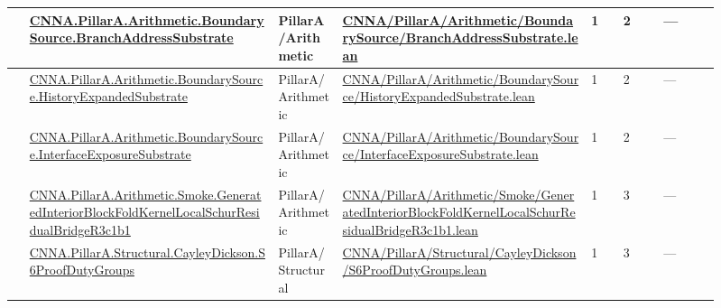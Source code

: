 \begin{longtable}{L{0.025\linewidth} L{0.315\linewidth} L{0.08\linewidth} L{0.315\linewidth} L{0.045\linewidth} L{0.055\linewidth} L{0.07\linewidth}}
\hline
{} & \href{run:repo_snapshot/CNNA/PillarA/Arithmetic/BoundarySource/BranchAddressSubstrate.lean}{CNNA.\allowbreak{}PillarA.\allowbreak{}Arithmetic.\allowbreak{}BoundarySource.\allowbreak{}BranchAddressSubstrate} & PillarA/\allowbreak{}Arithmetic & \href{run:repo_snapshot/CNNA/PillarA/Arithmetic/BoundarySource/BranchAddressSubstrate.lean}{CNNA/\allowbreak{}PillarA/\allowbreak{}Arithmetic/\allowbreak{}BoundarySource/\allowbreak{}BranchAddressSubstrate.\allowbreak{}lean} & 1 & 2 & ---\\
\hline
{} & \href{run:repo_snapshot/CNNA/PillarA/Arithmetic/BoundarySource/HistoryExpandedSubstrate.lean}{CNNA.\allowbreak{}PillarA.\allowbreak{}Arithmetic.\allowbreak{}BoundarySource.\allowbreak{}HistoryExpandedSubstrate} & PillarA/\allowbreak{}Arithmetic & \href{run:repo_snapshot/CNNA/PillarA/Arithmetic/BoundarySource/HistoryExpandedSubstrate.lean}{CNNA/\allowbreak{}PillarA/\allowbreak{}Arithmetic/\allowbreak{}BoundarySource/\allowbreak{}HistoryExpandedSubstrate.\allowbreak{}lean} & 1 & 2 & ---\\
\hline
{} & \href{run:repo_snapshot/CNNA/PillarA/Arithmetic/BoundarySource/InterfaceExposureSubstrate.lean}{CNNA.\allowbreak{}PillarA.\allowbreak{}Arithmetic.\allowbreak{}BoundarySource.\allowbreak{}InterfaceExposureSubstrate} & PillarA/\allowbreak{}Arithmetic & \href{run:repo_snapshot/CNNA/PillarA/Arithmetic/BoundarySource/InterfaceExposureSubstrate.lean}{CNNA/\allowbreak{}PillarA/\allowbreak{}Arithmetic/\allowbreak{}BoundarySource/\allowbreak{}InterfaceExposureSubstrate.\allowbreak{}lean} & 1 & 2 & ---\\
\hline
{} & \href{run:repo_snapshot/CNNA/PillarA/Arithmetic/Smoke/GeneratedInteriorBlockFoldKernelLocalSchurResidualBridgeR3c1b1.lean}{CNNA.\allowbreak{}PillarA.\allowbreak{}Arithmetic.\allowbreak{}Smoke.\allowbreak{}GeneratedInteriorBlockFoldKernelLocalSchurResidualBridgeR3c1b1} & PillarA/\allowbreak{}Arithmetic & \href{run:repo_snapshot/CNNA/PillarA/Arithmetic/Smoke/GeneratedInteriorBlockFoldKernelLocalSchurResidualBridgeR3c1b1.lean}{CNNA/\allowbreak{}PillarA/\allowbreak{}Arithmetic/\allowbreak{}Smoke/\allowbreak{}GeneratedInteriorBlockFoldKernelLocalSchurResidualBridgeR3c1b1.\allowbreak{}lean} & 1 & 3 & ---\\
\hline
{} & \href{run:repo_snapshot/CNNA/PillarA/Structural/CayleyDickson/S6ProofDutyGroups.lean}{CNNA.\allowbreak{}PillarA.\allowbreak{}Structural.\allowbreak{}CayleyDickson.\allowbreak{}S6ProofDutyGroups} & PillarA/\allowbreak{}Structural & \href{run:repo_snapshot/CNNA/PillarA/Structural/CayleyDickson/S6ProofDutyGroups.lean}{CNNA/\allowbreak{}PillarA/\allowbreak{}Structural/\allowbreak{}CayleyDickson/\allowbreak{}S6ProofDutyGroups.\allowbreak{}lean} & 1 & 3 & ---\\

\end{longtable}
